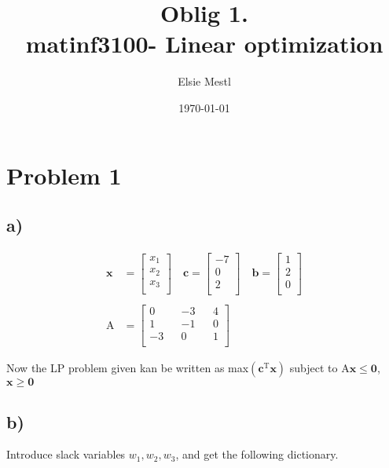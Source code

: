 \documentclass{article}
\author{Elsie Mestl}
\date{\today}
\title{Oblig 1. \\ matinf3100- Linear optimization}
\renewcommand{\vec}[1]{\mathbf{#1}}
\begin{document}
\maketitle


\section*{Problem 1}
\subsection*{a)}

\begin{align*}
  \vec{x} &=
  \begin{bmatrix}
    x_1 \\
    x_2 \\
    x_3 \\
  \end{bmatrix}
  \quad
  \vec{c} =
  \begin{bmatrix}
    -7 \\
    0 \\
    2 \\
  \end{bmatrix}
  \quad
  \vec{b} =
  \begin{bmatrix}
    1 \\
    2 \\
    0 \\
  \end{bmatrix} \\ \ \\
  \mathrm{A} &=
  \begin{bmatrix}
    0 && -3 && 4 \\
    1 && -1 && 0 \\
    -3 && 0 && 1 \\
  \end{bmatrix}
\end{align*}

Now the LP problem given kan be written as max$(\vec{c}^\mathrm{T}\vec{x})$ subject to $\mathrm{A}\vec{x} \leq \vec{0}$, $\vec{x} \geq \vec{0}$


\subsection*{b)}
Introduce slack variables $w_1, w_2, w_3$, and get the following dictionary.
\end{document}
